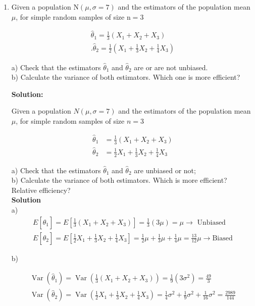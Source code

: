 \documentclass[12pt]{article}
\begin{document}
\begin{enumerate}
{}

\item Given a population $\mathrm{N}(\mu, \sigma=7)$ and the estimators of the population mean $\mu$, for simple random samples of size $\mathrm{n}=3$

$$
\begin{gathered}
\hat{\theta}_1=\frac{1}{3}\left(X_1+X_2+X_3\right) \\
.\hat{\theta}_2=\frac{1}{2} (X_1+\frac{1}{3} X_2+\frac{1}{4} X_3)
\end{gathered}
$$

a) Check that the estimators $\widehat{\theta}_1$ and $\widehat{\theta}_2$ are or are not unbiased.\\
b) Calculate the variance of both estimators. Which one is more efficient? 

{\color{blue}
\noindent \textbf{Solution:}

Given a population $N(\mu, \sigma=7)$ and the estimators of the population mean $\mu$, for simple random samples of size $n=3$

$$
\begin{aligned}
	\hat{\theta}_{1} & =\frac{1}{3}\left(X_{1}+X_{2}+X_{3}\right) \\
	\hat{\theta}_{2} & =\frac{1}{2} X_{1}+\frac{1}{3} X_{2}+\frac{1}{4} X_{3}
\end{aligned}
$$

\noindent a) Check that the estimators $\hat{\theta}_{1}$ and $\hat{\theta}_{2}$ are unbiased or not;\\

\noindent b) Calculate the variance of both estimators. Which is more efficient? Relative efficiency?\\

\noindent \textbf{Solution}\\

\noindent a) 
$$
\begin{gathered}
	E\left[\hat{\theta}_{1}\right]=E\left[\frac{1}{3}\left(X_{1}+X_{2}+X_{3}\right) \right]=\frac{1}{3}(3 \mu)=\mu \rightarrow \text { Unbiased } \\
	E\left[\hat{\theta}_{2}\right]=E\left[\frac{1}{2} X_{1}+\frac{1}{3} X_{2}+\frac {1}{4} X_{3}\right]=\frac{1}{2} \mu+\frac{1}{3} \mu+\frac{1}{4} \mu=\frac{13} {12} \mu \rightarrow \text {Biased} 
\end{gathered}
$$

\noindent b)

$$
\begin{gathered}
	\operatorname{Var}\left(\hat{\theta}_{1}\right)=\operatorname{Var}\left(\frac{1}{3}\left(X_{1}+X_{2} +X_{3}\right)\right)=\frac{1}{9}\left(3 \sigma^{2}\right)=\frac{49}{3} \\
	\operatorname{Var}\left(\hat{\theta}_{2}\right)=\operatorname{Var}\left(\frac{1}{2} X_{1}+\frac{1}{3 } X_{2}+\frac{1}{4} X_{3}\right)=\frac{1}{4} \sigma^{2}+\frac{1}{9} \sigma^{2 }+\frac{1}{16}\sigma^{2}=\frac{2989}{144}
\end{gathered}
$$

}
\end{enumerate}
\end{document}
